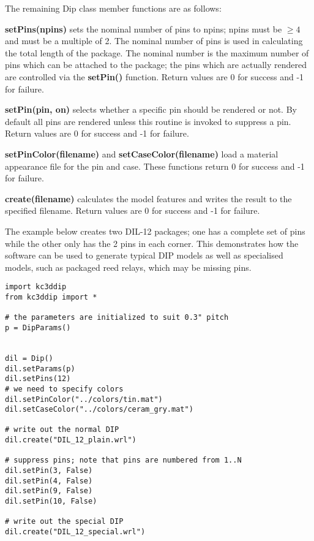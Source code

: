 \documentclass[a4paper, dvipdfm]{article}
\begin{document}
The remaining Dip class member functions are as follows:

\textbf{setPins(npins)} sets the nominal number of pins to npins; npins must
be $\ge4$ and must be a multiple of 2. The nominal number of pins is used in
calculating the total length of the package. The nominal number is the maximum
number of pins which can be attached to the package; the pins which are
actually rendered are controlled via the \textbf{setPin()} function.
Return values are 0 for success and -1 for failure.

\textbf{setPin(pin, on)} selects whether a specific pin should be rendered or
not. By default all pins are rendered unless this routine is invoked to suppress
a pin. Return values are 0 for success and -1 for failure.

\textbf{setPinColor(filename)} and \textbf{setCaseColor(filename)} load
a material appearance file for the pin and case. These functions return 0
for success and -1 for failure.

\textbf{create(filename)} calculates the model features and writes the
result to the specified filename. Return values are 0 for success and -1 for failure.

The example below creates two DIL-12 packages; one has a complete set of pins while
the other only has the 2 pins in each corner. This demonstrates how the software
can be used to generate typical DIP models as well as specialised models, such as
packaged reed relays, which may be missing pins.

\begin{verbatim}
import kc3ddip
from kc3ddip import *

# the parameters are initialized to suit 0.3" pitch
p = DipParams()


dil = Dip()
dil.setParams(p)
dil.setPins(12)
# we need to specify colors
dil.setPinColor("../colors/tin.mat")
dil.setCaseColor("../colors/ceram_gry.mat")

# write out the normal DIP
dil.create("DIL_12_plain.wrl")

# suppress pins; note that pins are numbered from 1..N
dil.setPin(3, False)
dil.setPin(4, False)
dil.setPin(9, False)
dil.setPin(10, False)

# write out the special DIP
dil.create("DIL_12_special.wrl")
\end{verbatim}
\end{document}
